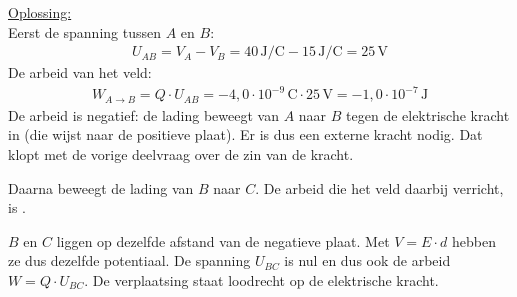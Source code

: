 \documentclass{ximera}
\begin{document}
\begin{exercise}
\begin{question}
\begin{solution}
            \underline{Oplossing:}\\
            Eerst de spanning tussen $A$ en $B$:
            \begin{align*}
                U_{AB} = V_A - V_B = 40 \, \mathrm{J/C} - 15 \, \mathrm{J/C} = 25 \, \mathrm{V}
            \end{align*}
            De arbeid van het veld:
            \begin{align*}
                W_{A \to B} = Q \cdot U_{AB} = -4{,}0 \cdot 10^{-9} \, \mathrm{C} \cdot 25 \, \mathrm{V} = \boxed{-1{,}0 \cdot 10^{-7} \, \mathrm{J}}
            \end{align*}
            De arbeid is negatief: de lading beweegt van $A$ naar $B$ tegen de elektrische kracht in (die wijst naar de positieve plaat). Er is dus een externe kracht nodig. Dat klopt met de vorige deelvraag over de zin van de kracht.
        \end{solution}
    \end{question}

    \begin{question}
        Daarna beweegt de lading van $B$ naar $C$. De arbeid die het veld daarbij verricht, is
        .

        \begin{solution}\nl
            $B$ en $C$ liggen op dezelfde afstand van de negatieve plaat. Met $V = E \cdot d$ hebben ze dus dezelfde potentiaal. De spanning $U_{BC}$ is nul en dus ook de arbeid $W = Q \cdot U_{BC}$. De verplaatsing staat loodrecht op de elektrische kracht.
        \end{solution}
    \end{question}
\end{exercise}
\end{document}
